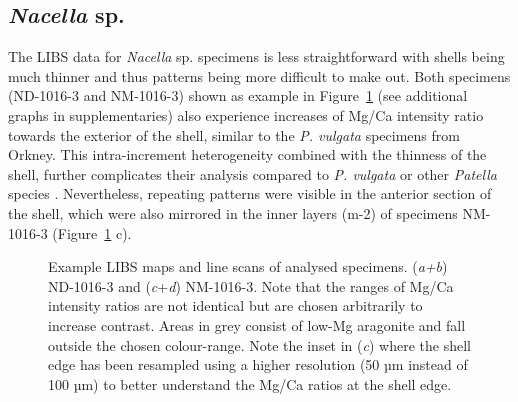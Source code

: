\documentclass[
  authoryear,
  preprint,
  3p]{elsarticle}
\begin{document}
\subsection{\texorpdfstring{\emph{Nacella}
sp.}{Nacella sp.}}\label{nacella-sp.}

The LIBS data for \emph{Nacella} sp. specimens is less straightforward
with shells being much thinner and thus patterns being more difficult to
make out. Both specimens (ND-1016-3 and NM-1016-3) shown as example in
Figure~\ref{fig-Nac_LIBS} (see additional graphs in supplementaries)
also experience increases of Mg/Ca intensity ratio towards the exterior
of the shell, similar to the \emph{P. vulgata} specimens from Orkney.
This intra-increment heterogeneity combined with the thinness of the
shell, further complicates their analysis compared to \emph{P. vulgata}
or other \emph{Patella} species \citep{Hausmann2019-fi}. Nevertheless,
repeating patterns were visible in the anterior section of the shell,
which were also mirrored in the inner layers (m-2) of specimens
NM-1016-3 (Figure~\ref{fig-Nac_LIBS} c).

\begin{figure}[H]


\caption{\label{fig-Nac_LIBS}Example LIBS maps and line scans of
analysed specimens. (\emph{a+b}) ND-1016-3 and (\emph{c}+\emph{d})
NM-1016-3. Note that the ranges of Mg/Ca intensity ratios are not
identical but are chosen arbitrarily to increase contrast. Areas in grey
consist of low-Mg aragonite and fall outside the chosen colour-range.
Note the inset in (\emph{c}) where the shell edge has been resampled
using a higher resolution (50 µm instead of 100 µm) to better understand
the Mg/Ca ratios at the shell edge.}

\end{figure}%
\end{document}
